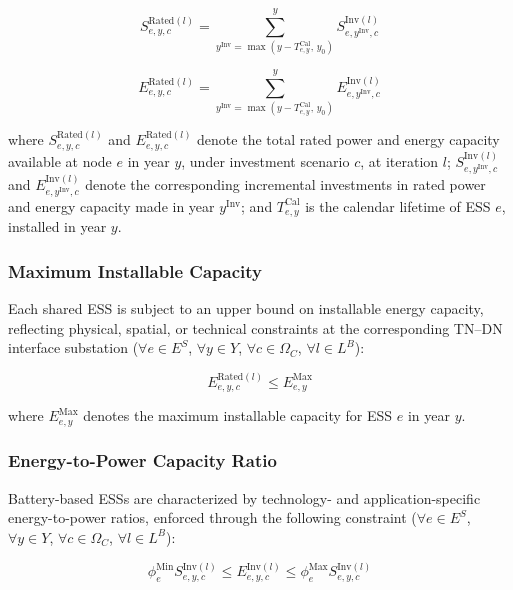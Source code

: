 \documentclass[preprint,12pt]{elsarticle}
\begin{document}
\begin{equation}
    S^{\text{Rated}(l)}_{e,y,c} = \sum_{y^\text{Inv}=\max(y-T^\text{Cal}_{e,y},\,y_0)}^{y} S^{\text{Inv}(l)}_{e,y^\text{Inv},c}
\end{equation}

\begin{equation}
    E^{\text{Rated}(l)}_{e,y,c} = \sum_{y^\text{Inv}=\max(y-T^\text{Cal}_{e,y},\,y_0)}^{y} E^{\text{Inv}(l)}_{e,y^\text{Inv},c}
\end{equation}

\noindent
where 
$S^{\text{Rated}(l)}_{e,y,c}$ and $E^{\text{Rated}(l)}_{e,y,c}$ denote the total rated power and energy capacity available at node $e$ in year $y$, under investment scenario $c$, at iteration $l$; 
$S^{\text{Inv}(l)}_{e,y^\text{Inv},c}$ and $E^{\text{Inv}(l)}_{e,y^\text{Inv},c}$ denote the corresponding incremental investments in rated power and energy capacity made in year $y^\text{Inv}$; and 
$T^\text{Cal}_{e,y}$ is the calendar lifetime of ESS $e$, installed in year $y$.

\subsubsection{Maximum Installable Capacity}

Each shared ESS is subject to an upper bound on installable energy capacity, reflecting physical, spatial, or technical constraints at the corresponding TN--DN interface substation ($\forall e \in E^S$, $\forall y \in Y$, $\forall c \in \Omega_C$, $\forall l \in L^B$):

\begin{equation}
    E_{e,y,c}^{\text{Rated}(l)} \leq E^{\text{Max}}_{e,y}
\end{equation}

\noindent
where $E^{\text{Max}}_{e,y}$ denotes the maximum installable capacity for ESS $e$ in year $y$.

\subsubsection{Energy-to-Power Capacity Ratio}

Battery-based ESSs are characterized by technology- and application-specific energy-to-power ratios, enforced through the following constraint ($\forall e \in E^S$, $\forall y \in Y$, $\forall c \in \Omega_C$, $\forall l \in L^B$):

\begin{equation}
    \phi^{\text{Min}}_e S^{\text{Inv}(l)}_{e,y,c} \leq 
    E^{\text{Inv}(l)}_{e,y,c} \leq 
    \phi^{\text{Max}}_e S^{\text{Inv}(l)}_{e,y,c}
\end{equation}
\end{document}
